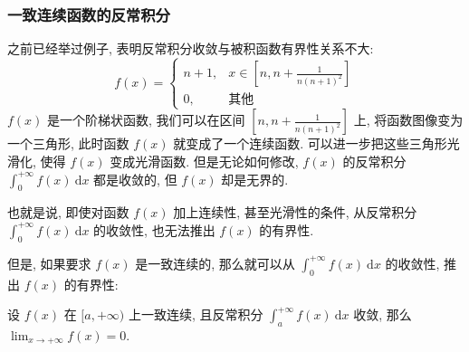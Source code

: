 \begin{frame}
\frametitle{一致连续函数的反常积分}

之前已经举过例子, 表明反常积分收敛与被积函数有界性关系不大:
\[
f(x) = \begin{cases} n + 1, & x \in \left[ n, n + \frac{1}{n(n+1)^2} \right] \\ 0, & \text{其他} \end{cases}
\]
$f(x)$ 是一个阶梯状函数, 我们可以在区间 $\left[ n, n + \frac{1}{n(n+1)^2} \right]$ 上, 将函数图像变为一个三角形, 此时函数 $f(x)$ 就变成了一个连续函数. 可以进一步把这些三角形光滑化, 使得 $f(x)$ 变成光滑函数. 但是无论如何修改, $f(x)$ 的反常积分 $\displaystyle \int_0^{+\infty} f(x) ~ \mathrm{d} x$ 都是收敛的, 但 $f(x)$ 却是无界的.

\pause
\vspace{0.5em}

也就是说, 即使对函数 $f(x)$ 加上连续性, 甚至光滑性的条件, 从反常积分 $\displaystyle \int_0^{+\infty} f(x) ~ \mathrm{d} x$ 的收敛性, 也无法推出 $f(x)$ 的有界性.

\pause
\vspace{0.5em}

但是, 如果要求 $f(x)$ 是一致连续的, 那么就可以从 $\displaystyle \int_0^{+\infty} f(x) ~ \mathrm{d} x$ 的收敛性, 推出 $f(x)$ 的有界性:

\begin{prop}
设 $f(x)$ 在 $[a, +\infty)$ 上一致连续, 且反常积分 $\displaystyle \int_a^{+\infty} f(x) ~ \mathrm{d} x$ 收敛, 那么 $\lim_{x \to +\infty} f(x) = 0.$
\end{prop}

\end{frame}


